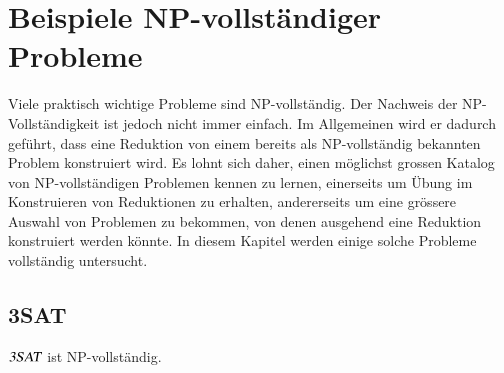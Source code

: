 %
%
%
\section{Beispiele NP-vollständiger Probleme}
Viele praktisch wichtige Probleme sind NP-vollständig.
Der Nachweis der NP-Vollständigkeit ist jedoch nicht immer einfach.
Im Allgemeinen
wird er dadurch geführt, dass eine Reduktion von einem bereits als
NP-vollständig bekannten Problem konstruiert wird.
Es lohnt sich
daher, einen möglichst grossen Katalog von NP-vollständigen
Problemen kennen zu lernen, einerseits um Übung im Konstruieren
von Reduktionen zu erhalten, andererseits um eine grössere Auswahl 
von Problemen zu bekommen, von denen ausgehend eine Reduktion 
konstruiert werden könnte.
In diesem Kapitel werden einige solche Probleme vollständig untersucht.
\subsection{3SAT}
%
\begin{satz}
$\text{\textsl{3SAT}}$ ist NP-vollständig.
\end{satz}

